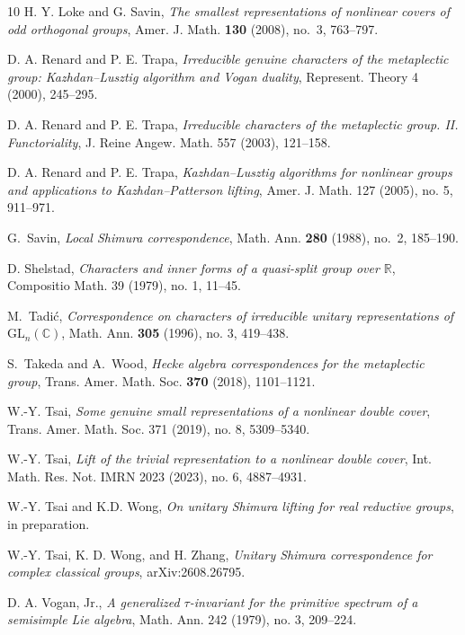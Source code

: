 \documentclass{amsart}
\newcommand{\bbR}{{\mathbb R}}
\theoremstyle{definition}
\begin{document}
\begin{thebibliography}{10}
H. Y. Loke and G. Savin,
\emph{The smallest representations of nonlinear covers of odd orthogonal groups},
Amer. J. Math. \textbf{130} (2008), no.~3, 763--797.


D. A. Renard and P. E. Trapa,
\emph{Irreducible genuine characters of the metaplectic group:
Kazhdan--Lusztig algorithm and Vogan duality},
Represent. Theory 4 (2000), 245--295.

D. A. Renard and P. E. Trapa,
\emph{Irreducible characters of the metaplectic group. II. Functoriality},
J. Reine Angew. Math. 557 (2003), 121--158.

D. A. Renard and P. E. Trapa,
\emph{Kazhdan--Lusztig algorithms for nonlinear groups and applications to
Kazhdan--Patterson lifting},
Amer. J. Math. 127 (2005), no. 5, 911--971.


G.~Savin,
\emph{Local Shimura correspondence},
Math. Ann. \textbf{280} (1988), no.~2, 185--190.


D. Shelstad,
\emph{Characters and inner forms of a quasi-split group over \(\bbR\)},
Compositio Math. 39 (1979), no. 1, 11--45.

M.~Tadi\'c, 
{\em Correspondence on characters of irreducible unitary representations of $\mathrm{GL}_{n}(\mathbb{C})$}, Math. Ann. \textbf{305} (1996), no. 3, 419--438.

S.~Takeda and A.~Wood,
\emph{Hecke algebra correspondences for the metaplectic group},
Trans. Amer. Math. Soc. \textbf{370} (2018), 1101--1121.

W.-Y. Tsai,
\emph{Some genuine small representations of a nonlinear double cover},
Trans. Amer. Math. Soc. 371 (2019), no. 8, 5309--5340.

W.-Y. Tsai,
\emph{Lift of the trivial representation to a nonlinear double cover},
Int. Math. Res. Not. IMRN 2023 (2023), no. 6, 4887--4931.



W.-Y. Tsai and  K.D. Wong, {\it On unitary Shimura lifting for real reductive groups}, in preparation.

 W.-Y. Tsai, K. D. Wong, and H. Zhang,
\emph{Unitary Shimura correspondence for complex classical groups},
arXiv:2608.26795.

D. A. Vogan, Jr.,
\emph{A generalized \(\tau\)-invariant for the primitive spectrum of a
semisimple Lie algebra},
Math. Ann. 242 (1979), no. 3, 209--224.


\end{thebibliography}
\end{document}

